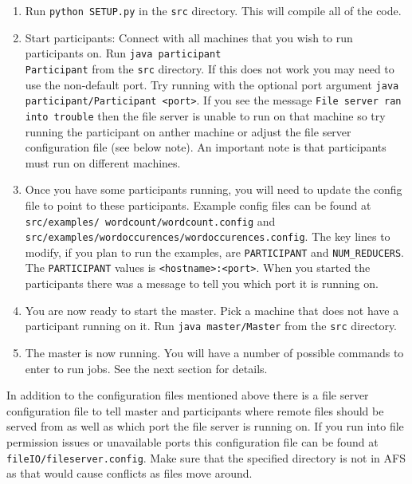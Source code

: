 \documentclass[12pt]{article}
\newcommand{\ttt}{\texttt}
\begin{document}
\begin{enumerate}
\item 
Run \ttt{python SETUP.py} in the \ttt{src} directory. This will compile all of the code.

\item
Start participants: Connect with all machines that you wish to run participants on. Run \ttt{java participant\\Participant} from the \ttt{src} directory. If this does not work you may need to use the non-default port. Try running with the optional port argument \ttt{java participant/Participant <port>}. If you see the message \ttt{File server ran into trouble} then the file server is unable to run on that machine so try running the participant on anther machine or adjust the file server configuration file (see below note). An important note is that participants must run on different machines.

\item
Once you have some participants running, you will need to update the config file to point to these participants. Example config files can be found at \ttt{src/examples/ wordcount/wordcount.config} and \ttt{src/examples/wordoccurences/wordoccurences.config}. The key lines to modify, if you plan to run the examples, are \ttt{PARTICIPANT} and \ttt{NUM\_REDUCERS}. The \ttt{PARTICIPANT} values is \ttt{<hostname>:<port>}. When you started the participants there was a message to tell you which port it is running on.

\item
You are now ready to start the master. Pick a machine that does not have a participant running on it. Run \ttt{java master/Master} from the \ttt{src} directory.

\item
The master is now running. You will have a number of possible commands to enter to run jobs. See the next section for details.

\end{enumerate}

In addition to the configuration files mentioned above there is a file server configuration file to tell master and participants where remote files should be served from as well as which port the file server is running on. If you run into file permission issues or unavailable ports this configuration file can be found at \ttt{fileIO/fileserver.config}. Make sure that the specified directory is not in AFS as that would cause conflicts as files move around.
\end{document}
